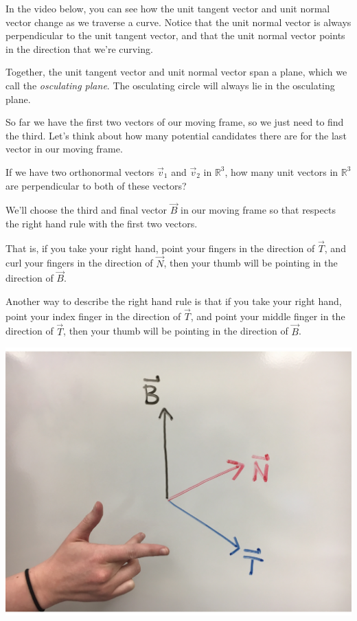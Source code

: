 \documentclass{ximera}
\begin{document}
In the video below, you can see how the unit tangent vector and unit normal vector change as we traverse a curve. Notice that the unit normal vector is always perpendicular to the unit tangent vector, and that the unit normal vector points in the direction that we're curving.


Together, the unit tangent vector and unit normal vector span a plane, which we call the \emph{osculating plane}. The osculating circle will always lie in the osculating plane.
 
 So far we have the first two vectors of our moving frame, so we just need to find the third. Let's think about how many potential candidates there are for the last vector in our moving frame.
 
 If we have two orthonormal vectors $\vec{v}_1$ and $\vec{v}_2$ in $\mathbb{R}^3$, how many unit vectors in $\mathbb{R}^3$ are perpendicular to both of these vectors?
 \begin{multipleChoice}
 \end{multipleChoice}
 
 We'll choose the third and final vector $\vec{B}$ in our moving frame so that respects the right hand rule with the first two vectors.
 
That is, if you take your right hand, point your fingers in the direction of $\vec{T}$, and curl your fingers in the direction of $\vec{N}$, then your thumb will be pointing in the direction of $\vec{B}$.


Another way to describe the right hand rule is that if you take your right hand, point your index finger in the direction of $\vec{T}$, and point your middle finger in the direction of $\vec{T}$, then your thumb will be pointing in the direction of $\vec{B}$.

\begin{image}
\includegraphics[width = \textwidth]{right_hand_rule}
\end{image}
 
\end{document}
